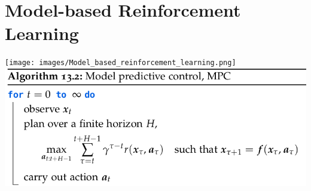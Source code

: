\section{Model-based Reinforcement Learning}

\texttt{[image: images/Model\_based\_reinforcement\_learning.png]}
\includegraphics[width=0.95\linewidth,trim={0 0 3cm 0}]{images/MPC.png}